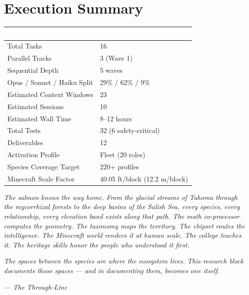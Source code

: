 \documentclass[11pt,letterpaper]{article}
\newcommand{\tableheader}[1]{\textbf{\sffamily\textcolor{white}{#1}}}
\begin{document}
\section{Execution Summary}

\begin{center}
\begin{tabularx}{\textwidth}{L{5cm}X}
\toprule
{}
\tableheader{Metric} & \tableheader{Value} \\
\midrule
Total Tasks & 16 \\
Parallel Tracks & 3 (Wave 1) \\
Sequential Depth & 5 waves \\
Opus / Sonnet / Haiku Split & 29\% / 62\% / 9\% \\
Estimated Context Windows & 23 \\
Estimated Sessions & 10 \\
Estimated Wall Time & 8--12 hours \\
Total Tests & 32 (6 safety-critical) \\
Deliverables & 12 \\
Activation Profile & Fleet (20 roles) \\
Species Coverage Target & 220+ profiles \\
Minecraft Scale Factor & 40.05 ft/block (12.2 m/block) \\
\bottomrule
\end{tabularx}
\end{center}

\vspace{1cm}

\begin{quotebox}
\textit{The salmon knows the way home. From the glacial streams of Tahoma through the mycorrhizal forests to the deep basins of the Salish Sea, every species, every relationship, every elevation band exists along that path. The math co-processor computes the geometry. The taxonomy maps the territory. The chipset routes the intelligence. The Minecraft world renders it at human scale. The college teaches it. The heritage skills honor the people who understood it first.}

\vspace{0.5em}

\textit{The spaces between the species are where the ecosystem lives. This research block documents those spaces --- and in documenting them, becomes one itself.}

\vspace{0.5em}

\hfill --- \textit{The Through-Line}
\end{quotebox}
\end{document}

